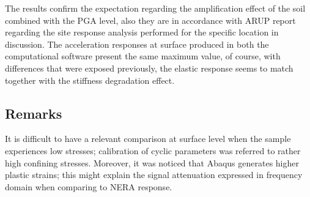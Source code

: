 	The results confirm the expectation regarding the amplification effect of the soil combined with the PGA level, also they are in accordance with ARUP report regarding the site response analysis performed for the specific location in discussion. The acceleration responses at surface produced in both the computational software present the same maximum value, of course, with differences that were exposed previously, the elastic response seems to match together with the stiffness degradation effect. 
	
	
	
	\pagebreak
	\subsection{Remarks}
	It is difficult to have a relevant comparison at surface level when the sample experiences low stresses; calibration of cyclic parameters was referred to rather high confining stresses. Moreover, it was noticed that Abaqus generates higher plastic strains; this might explain the signal attenuation expressed in frequency domain when comparing to NERA response. 
	
